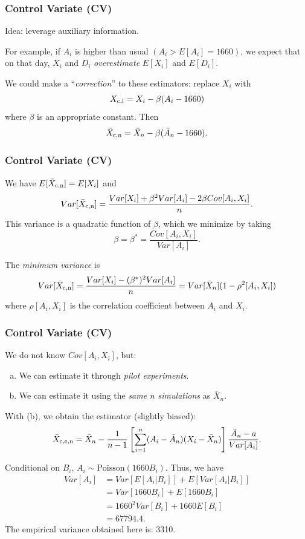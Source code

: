 \documentclass[t,usepdftitle=false]{beamer}
\begin{document}
\begin{frame}
	\frametitle{Control Variate (CV)}
	
	Idea: leverage auxiliary information.
	
	\mbox{}
	
	For example, if \(A_i\) is higher than usual \((A_i > E[A_i] = 1660)\),
	we expect that on that day, \(X_i\) and \(D_i\) 
	\emph{overestimate} \(E[X_i]\) and \(E[D_i]\).
	
	\mbox{}
	
	We could make a ``\emph{correction}'' to these estimators:
	replace \(X_i\) with
	$$ X_{\rm{c},i} = X_i - {\beta} (A_i - 1660) $$
	where \(\beta\) is an appropriate constant. Then
	\[
	{\bar X_{\rm{c},n}} = \bar X_n - \beta (\bar A_n - 1660).
	\]
	
\end{frame}

\begin{frame}
	\frametitle{Control Variate (CV)}
	
	We have \(E[\bar X_{\rm{c},n}] = E[X_i]\) and 
	$$ Var[\bar X_{\rm{c},n}] 
	= \frac{Var[X_i] + \beta^2Var[A_i] - 2 \beta Cov[A_i,X_i]}{n}. $$ 
	This variance is a quadratic function of \(\beta\), which we minimize
	by taking
	\[
	\beta = {\beta^*} = \frac{Cov[A_i, X_i]}{Var[A_i]}.
	\]
	
	\mbox{}
	
	The \emph{minimum variance} is
	$$ Var[\bar X_{\rm{c},n}] = \frac{Var[X_i] - (\beta^*)^2 Var[A_i]}{n}
	= Var[\bar X_n] (1- \rho^2[A_i,X_i]) $$
	where \({\rho[A_i, X_i]}\) is the correlation coefficient between 
	\(A_i\) and \(X_i\).
	
\end{frame}

\begin{frame}
	\frametitle{Control Variate (CV)}
	
	We do not know \(Cov[A_i, X_i]\), but:
	\begin{enumerate}[(a)]
		\item We can estimate it through \emph{pilot experiments}.
		\item We can estimate it using the \emph{same \(n\) simulations} as \(\bar X_n\).
	\end{enumerate}
	
	\mbox{}
	
	With (b), we obtain the estimator (slightly biased):
	\[
	\bar X_{\rm{c},e,n} = \bar X_n - {1\over n-1} \left[\sum_{i=1}^n
	(A_i-\bar A_n)(X_i-\bar X_n)\right] {\bar A_n - a\over Var[A_i]}.
	\]
	
	\mbox{}
	
	Conditional on \(B_i\), \(A_i \sim \text{Poisson}(1660 B_i)\). Thus, we have
	\begin{align*}
		{Var[A_i]} &= Var[E[A_i|B_i]] + E[Var[A_i|B_i]] \\
		&= Var[1660 B_i] + E[1660 B_i] \\
		&= 1660^2 Var[B_i] + 1660 E[B_i] \\
		&= 67794.4.
	\end{align*}
	The empirical variance obtained here is: {3310}.
	
\end{frame}
\end{document}
